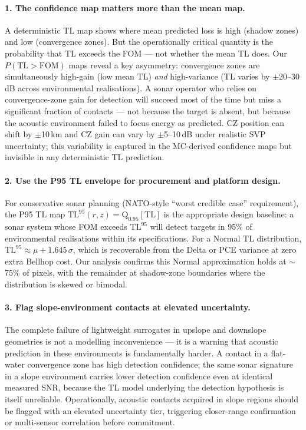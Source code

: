 \documentclass[11pt,a4paper]{article}
\begin{document}
\paragraph{1. The confidence map matters more than the mean map.}
A deterministic TL map shows where mean predicted loss is high (shadow zones) and low
(convergence zones).
But the operationally critical quantity is the probability that TL exceeds the FOM ---
not whether the mean TL does.
Our $P(\mathrm{TL} > \mathrm{FOM})$ maps reveal a key asymmetry: convergence zones are
simultaneously high-gain (low mean TL) \emph{and} high-variance (TL varies by $\pm$20--30\,dB
across environmental realisations).
A sonar operator who relies on convergence-zone gain for detection will succeed most of the
time but miss a significant fraction of contacts --- not because the target is absent, but
because the acoustic environment failed to focus energy as predicted.
CZ position can shift by $\pm$10\,km and CZ gain can vary by $\pm$5--10\,dB under realistic
SVP uncertainty; this variability is captured in the MC-derived confidence maps but invisible
in any deterministic TL prediction.

\paragraph{2. Use the P95 TL envelope for procurement and platform design.}
For conservative sonar planning (NATO-style ``worst credible case'' requirement),
the P95 TL map $\mathrm{TL}^{95}(r,z) = \mathrm{Q}_{0.95}[\mathrm{TL}]$ is the
appropriate design baseline:
a sonar system whose FOM exceeds $\mathrm{TL}^{95}$ will detect targets in 95\% of
environmental realisations within its specifications.
For a Normal TL distribution, $\mathrm{TL}^{95} \approx \mu + 1.645\,\sigma$, which is
recoverable from the Delta or PCE variance at zero extra Bellhop cost.
Our analysis confirms this Normal approximation holds at $\sim$75\% of pixels, with the
remainder at shadow-zone boundaries where the distribution is skewed or bimodal.

\paragraph{3. Flag slope-environment contacts at elevated uncertainty.}
The complete failure of lightweight surrogates in upslope and downslope geometries is not
a modelling inconvenience --- it is a warning that acoustic prediction in these environments
is fundamentally harder.
A contact in a flat-water convergence zone has high detection confidence; the same sonar
signature in a slope environment carries lower detection confidence even at identical
measured SNR, because the TL model underlying the detection hypothesis is itself unreliable.
Operationally, acoustic contacts acquired in slope regions should be flagged with an
elevated uncertainty tier, triggering closer-range confirmation or multi-sensor correlation
before commitment.
\end{document}
